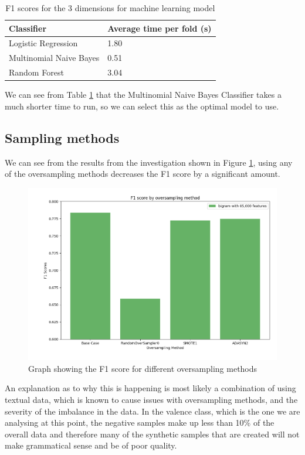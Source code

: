 \begin{table}
\centering
\caption{F1 scores for the 3 dimensions for machine learning model}
\begin{tabular}{ |p{3cm}|p{3cm}|}
 \hline
  Classifier & Average time per fold (s)\\
 \hline
  Logistic Regression & 1.80\\
  Multinomial Naive Bayes & 0.51 \\
  Random Forest & 3.04\\
 \hline
\end{tabular}
\label{model:times}
\end{table}

We can see from Table \ref{model:times} that the Multinomial Naive Bayes Classifier takes a much shorter time to run, so we can select this as the optimal model to use.

\subsection{Sampling methods}

We can see from the results from the investigation shown in  Figure \ref{oversamplegraph}, using any of the oversampling methods decreases the F1 score by a significant amount. 

\begin{figure}[ht]
\centering
\includegraphics[scale=0.5]{graphs/OversampleNB.png}
\caption{Graph showing the F1 score for different oversampling methods}
\label{oversamplegraph}
\end{figure}

An explanation as to why this is happening is most likely a combination of using textual data, which is known to cause issues with oversampling methods, and the severity of the imbalance in the data. In the valence class, which is the one we are analysing at this point, the negative samples make up less than 10\% of the overall data and therefore many of the synthetic samples that are created will not make grammatical sense and be of poor quality. 

